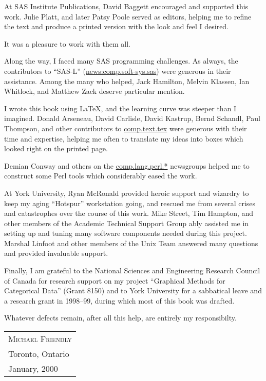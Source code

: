 At SAS Institute Publications, David Baggett encouraged and supported this work.
Julie Platt, and later Patsy Poole served as editors, helping me to
refine the text and produce a printed version with the look and feel
I desired.
\begin{changebar} 
It was a pleasure to work with them all.

Along the way, I faced many SAS programming challenges.  As always,
the contributors to ``SAS-L'' (\url{news:comp.soft-sys.sas}) were generous
in their assistance.  Among the many who helped,
Jack Hamilton,
Melvin Klassen,
Ian Whitlock, and
Matthew Zack deserve particular mention.
\end{changebar}


I wrote this book using \LaTeX, and the learning curve was steeper
than I imagined.  Donald Arseneau, David Carlisle, David Kastrup,
Bernd Schandl,
Paul Thompson, and other contributors to \url{comp.text.tex} were
generous with their time and expertise, helping me often to translate
my ideas into boxes which looked right on the printed page.
\begin{changebar}
Demian Conway and others on the \url{comp.lang.perl.*} newsgroups
helped me to construct some Perl tools which considerably eased the
work.
\end{changebar}

At York University,
Ryan McRonald provided heroic support and wizardry to keep my aging
``Hotspur'' workstation going, and rescued me from several crises
and catastrophes over the course of this work.  
Mike Street, Tim
Hampton, and other members of the Academic Technical Support Group
ably assisted me in setting up and tuning many
software components needed during this project.
Marshal Linfoot and other members of the Unix Team answered many
questions and provided invaluable support.

Finally, I am grateful to the National Sciences and Engineering Research
Council of Canada for research support on my project
``Graphical Methods for Categorical Data'' (Grant 8150)
and to York University for a sabbatical leave and a research grant
in 1998--99, during which most of this book was drafted.

Whatever defects remain, after all this help, are entirely my
responsibilty.
\vspace*{1in}

\begin{tabular}{l}
\textsc{Michael Friendly} \\ Toronto, Ontario \\ January, 2000
\end{tabular}

